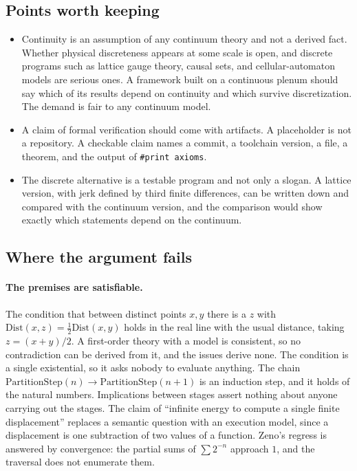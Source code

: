 \documentclass[11pt]{article}
\begin{document}
\subsection{Points worth keeping}

\begin{itemize}[leftmargin=2em]
\item Continuity is an assumption of any continuum theory and not a derived fact. Whether physical discreteness appears at some scale is open, and discrete programs such as lattice gauge theory, causal sets, and cellular-automaton models are serious ones. A framework built on a continuous plenum should say which of its results depend on continuity and which survive discretization. The demand is fair to any continuum model.
\item A claim of formal verification should come with artifacts. A placeholder is not a repository. A checkable claim names a commit, a toolchain version, a file, a theorem, and the output of \texttt{\#print axioms}.
\item The discrete alternative is a testable program and not only a slogan. A lattice version, with jerk defined by third finite differences, can be written down and compared with the continuum version, and the comparison would show exactly which statements depend on the continuum.
\end{itemize}

\subsection{Where the argument fails}

\paragraph{The premises are satisfiable.} The condition that between distinct points $x,y$ there is a $z$ with $\mathrm{Dist}(x,z)=\tfrac12\mathrm{Dist}(x,y)$ holds in the real line with the usual distance, taking $z=(x+y)/2$. A first-order theory with a model is consistent, so no contradiction can be derived from it, and the issues derive none. The condition is a single existential, so it asks nobody to evaluate anything. The chain $\mathrm{PartitionStep}(n)\to\mathrm{PartitionStep}(n+1)$ is an induction step, and it holds of the natural numbers. Implications between stages assert nothing about anyone carrying out the stages. The claim of ``infinite energy to compute a single finite displacement'' replaces a semantic question with an execution model, since a displacement is one subtraction of two values of a function. Zeno's regress is answered by convergence: the partial sums of $\sum 2^{-n}$ approach $1$, and the traversal does not enumerate them.
\end{document}
